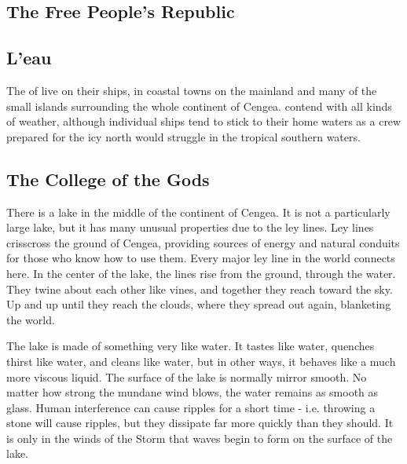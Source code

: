 \documentclass[blue]{GL2020}
\begin{document}

\subsection*{The Free People's Republic}


\subsection*{L'eau}
The \pShippies{} of \pShip{} live on their ships, in coastal towns on the mainland and many of the small islands surrounding the whole continent of Cengea. \pShippies{} contend with all kinds of weather, although individual ships tend to stick to their home waters as a crew prepared for the icy north would struggle in the tropical southern waters. 
\subsection*{The College of the Gods}
There is a lake in the middle of the continent of Cengea. It is not a particularly large lake, but it has many unusual properties due to the ley lines. Ley lines crisscross the ground of Cengea, providing sources of energy and natural conduits for those who know how to use them. Every major ley line in the world connects here. In the center of the lake, the lines rise from the ground, through the water. They twine about each other like vines, and together they reach toward the sky. Up and up until they reach the clouds, where they spread out again, blanketing the world.

The lake is made of something very like water. It tastes like water, quenches thirst like water, and cleans like water, but in other ways, it behaves like a much more viscous liquid. The surface of the lake is normally mirror smooth. No matter how strong the mundane wind blows, the water remains as smooth as glass. Human interference can cause ripples for a short time - i.e. throwing a stone will cause ripples, but they dissipate far more quickly than they should. It is only in the winds of the Storm that waves begin to form on the surface of the lake.


\end{document}
